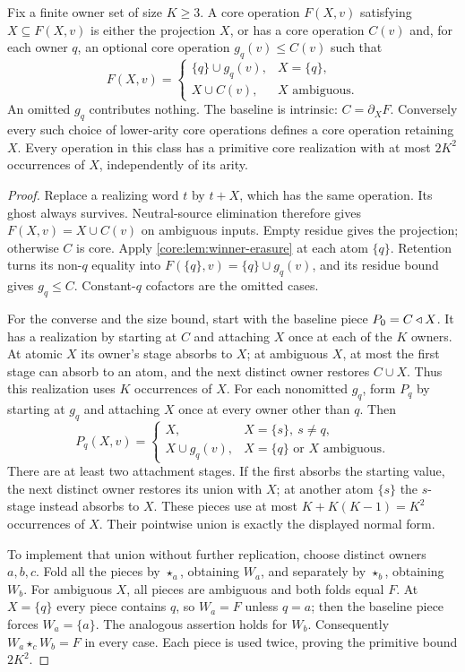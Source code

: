 \begin{theorem}
\label{core:thm:retained-source}
Fix a finite owner set of size $K\geq3$. A core operation $F(X,v)$
satisfying $X\subseteq F(X,v)$ is either the projection $X$, or has
a core operation $C(v)$ and, for each owner $q$, an optional core
operation $g_q(v)\leq C(v)$ such that
\[
 F(X,v)=
 \begin{cases}
  \{q\}\cup g_q(v),&X=\{q\},\\
  X\cup C(v),&X\text{ ambiguous}.
 \end{cases}
\]
An omitted $g_q$ contributes nothing. The baseline is intrinsic:
$C=\partial_XF$. Conversely every such choice of lower-arity core
operations defines a core operation retaining $X$.
Every operation in this class has a primitive core realization with
at most $2K^2$ occurrences of $X$, independently of its arity.
\end{theorem}
\begin{proof}
Replace a realizing word $t$ by $t+X$, which has the same operation.
Its ghost always survives. Neutral-source elimination therefore gives
$F(X,v)=X\cup C(v)$ on ambiguous inputs. Empty residue gives the
projection; otherwise $C$ is core. Apply
\cref{core:lem:winner-erasure} at each atom $\{q\}$.
Retention turns its non-$q$ equality into
$F(\{q\},v)=\{q\}\cup g_q(v)$, and its residue bound gives $g_q\leq C$.
Constant-$q$ cofactors are the omitted cases.

For the converse and the size bound, start with the baseline piece
$P_0=C\mathbin{\triangleleft} X$. It has a realization by starting at $C$ and attaching
$X$ once at each of the $K$ owners. At atomic $X$ its owner's stage
absorbs to $X$; at ambiguous $X$, at most the first stage can absorb
to an atom, and the next distinct owner restores $C\cup X$.
Thus this realization uses $K$ occurrences of $X$.
For each nonomitted $g_q$, form $P_q$ by starting at $g_q$ and
attaching $X$ once at every owner other than $q$. Then
\[
 P_q(X,v)=
 \begin{cases}
 X,&X=\{s\},\ s\ne q,\\
 X\cup g_q(v),&X=\{q\}\text{ or }X\text{ ambiguous}.
 \end{cases}
\]
There are at least two attachment stages. If the first absorbs the
starting value, the next distinct owner restores its union with $X$;
at another atom $\{s\}$ the $s$-stage instead absorbs to $X$.
These pieces use at most $K+K(K-1)=K^2$ occurrences of $X$.
Their pointwise union is exactly the displayed normal form.

To implement that union without further replication, choose distinct
owners $a,b,c$. Fold all the pieces by $\star_a$, obtaining $W_a$,
and separately by $\star_b$, obtaining $W_b$. For ambiguous $X$, all
pieces are ambiguous and both folds equal $F$. At $X=\{q\}$ every
piece contains $q$, so $W_a=F$ unless $q=a$; then the baseline piece
forces $W_a=\{a\}$. The analogous assertion holds for $W_b$.
Consequently $W_a\star_cW_b=F$ in every case. Each piece is used
twice, proving the primitive bound $2K^2$.
\end{proof}


